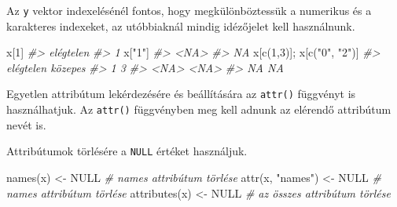 \documentclass[
]{book}
\newenvironment{Shaded}{\begin{snugshade}}{\end{snugshade}}
\newcommand{\CommentTok}[1]{\textcolor[rgb]{0.56,0.35,0.01}{\textit{#1}}}
\newcommand{\ConstantTok}[1]{\textcolor[rgb]{0.00,0.00,0.00}{#1}}
\newcommand{\DecValTok}[1]{\textcolor[rgb]{0.00,0.00,0.81}{#1}}
\newcommand{\FunctionTok}[1]{\textcolor[rgb]{0.00,0.00,0.00}{#1}}
\newcommand{\NormalTok}[1]{#1}
\newcommand{\OtherTok}[1]{\textcolor[rgb]{0.56,0.35,0.01}{#1}}
\newcommand{\StringTok}[1]{\textcolor[rgb]{0.31,0.60,0.02}{#1}}
\begin{document}
Az \texttt{y} vektor indexelésénél fontos, hogy megkülönböztessük a numerikus és a karakteres indexeket, az utóbbiaknál mindig idézőjelet kell használnunk.

\begin{Shaded}
\begin{Highlighting}[]
\NormalTok{x[}\DecValTok{1}\NormalTok{]}
\CommentTok{\#\textgreater{} elégtelen }
\CommentTok{\#\textgreater{}         1}
\NormalTok{x[}\StringTok{"1"}\NormalTok{]}
\CommentTok{\#\textgreater{} \textless{}NA\textgreater{} }
\CommentTok{\#\textgreater{}   NA}
\NormalTok{x[}\FunctionTok{c}\NormalTok{(}\DecValTok{1}\NormalTok{,}\DecValTok{3}\NormalTok{)]; x[}\FunctionTok{c}\NormalTok{(}\StringTok{"0"}\NormalTok{, }\StringTok{"2"}\NormalTok{)]}
\CommentTok{\#\textgreater{} elégtelen   közepes }
\CommentTok{\#\textgreater{}         1         3}
\CommentTok{\#\textgreater{} \textless{}NA\textgreater{} \textless{}NA\textgreater{} }
\CommentTok{\#\textgreater{}   NA   NA}
\end{Highlighting}
\end{Shaded}

Egyetlen attribútum lekérdezésére és beállítására az \texttt{attr()} függvényt is használhatjuk. Az \texttt{attr()} függvényben meg kell adnunk az elérendő attribútum nevét is.

\begin{Shaded}
\end{Shaded}

Attribútumok törlésére a \texttt{NULL} értéket használjuk.

\begin{Shaded}
\begin{Highlighting}[]
\FunctionTok{names}\NormalTok{(x) }\OtherTok{\textless{}{-}} \ConstantTok{NULL}             \CommentTok{\# names attribútum törlése}
\FunctionTok{attr}\NormalTok{(x, }\StringTok{"names"}\NormalTok{) }\OtherTok{\textless{}{-}} \ConstantTok{NULL}     \CommentTok{\# names attribútum törlése}
\FunctionTok{attributes}\NormalTok{(x) }\OtherTok{\textless{}{-}} \ConstantTok{NULL}        \CommentTok{\# az összes attribútum törlése}
\end{Highlighting}
\end{Shaded}
\end{document}
